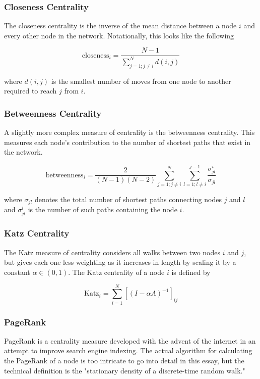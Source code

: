 \subsubsection{Closeness Centrality}
The closeness centrality is the inverse of the mean distance between a node $i$ and every other node in the network. Notationally, this looks like the following

$$ \text{closeness}_i = \frac{N - 1}{\sum_{j=1; j\not=i}^N d(i, j)} $$

where $d(i, j)$ is the smallest number of moves from one node to another required to reach $j$ from $i$.

\subsubsection{Betweenness Centrality}
A slightly more complex measure of centrality is the betweenness centrality. This measures each node's contribution to the number of shortest paths that exist in the network.

$$ \text{betweenness}_i = \frac{2}{(N-1)(N-2)}\sum_{j=1; j\not=i}^N \sum_{l=1; l\not=i}^{j-1} \frac{\sigma_{jl}^i}{\sigma_{jl}} $$

where $\sigma_{jl}$ denotes the total number of shortest paths connecting nodes $j$ and $l$ and $\sigma_{jl}^i$ is the number of such paths containing the node $i$.

\subsubsection{Katz Centrality}
The Katz measure of centrality considers all walks between two nodes $i$ and $j$, but gives each one less weighting as it increases in length by scaling it by a constant $\alpha \in (0, 1)$. The Katz centrality of a node $i$ is defined by

$$ \text{Katz}_i = \sum_{i=1}^N[(I - \alpha A)^{-1}]_{ij} $$

\subsubsection{PageRank}
PageRank is a centrality measure developed with the advent of the internet in an attempt to improve search engine indexing. The actual algorithm for calculating the PageRank of a node is too intricate to go into detail in this essay, but the technical definition is the "stationary density of a discrete-time random walk."\cite[19]{oxford:renaud_notes}

